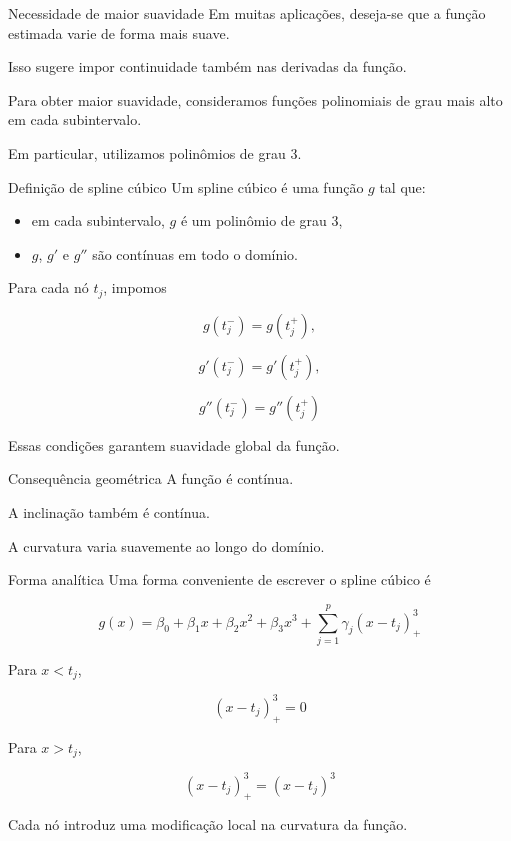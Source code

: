 \documentclass[
  ignorenonframetext,
  aspectratio=169,
]{beamer}
\providecommand{\tightlist}{%
  \setlength{\itemsep}{0pt}\setlength{\parskip}{0pt}}
\begin{document}
\begin{frame}
\begin{block}{Necessidade de maior suavidade}
\label{necessidade-de-maior-suavidade}
Em muitas aplicações, deseja-se que a função estimada varie de forma
mais suave.

Isso sugere impor continuidade também nas derivadas da função.

Para obter maior suavidade, consideramos funções polinomiais de grau
mais alto em cada subintervalo.

Em particular, utilizamos polinômios de grau 3.
\end{block}
\end{frame}

\begin{frame}
\begin{block}{Definição de spline cúbico}
\label{definiuxe7uxe3o-de-spline-cuxfabico}
Um spline cúbico é uma função \(g\) tal que:

\begin{itemize}
\tightlist
\item
  em cada subintervalo, \(g\) é um polinômio de grau 3,
\item
  \(g\), \(g'\) e \(g''\) são contínuas em todo o domínio.
\end{itemize}

Para cada nó \(t_j\), impomos

\[
g(t_j^-) = g(t_j^+),
\]

\[
g'(t_j^-) = g'(t_j^+),
\]

\[
g''(t_j^-) = g''(t_j^+)
\]

Essas condições garantem suavidade global da função.
\end{block}
\end{frame}

\begin{frame}
\begin{block}{Consequência geométrica}
\label{consequuxeancia-geomuxe9trica}
A função é contínua.

A inclinação também é contínua.

A curvatura varia suavemente ao longo do domínio.
\end{block}
\end{frame}

\begin{frame}
\begin{block}{Forma analítica}
\label{forma-analuxedtica-1}
Uma forma conveniente de escrever o spline cúbico é

\[
g(x) = \beta_0 + \beta_1 x + \beta_2 x^2 + \beta_3 x^3 + \sum_{j=1}^{p} \gamma_j (x - t_j)_+^3
\]

Para \(x < t_j\),

\[
(x - t_j)_+^3 = 0
\]

Para \(x > t_j\),

\[
(x - t_j)_+^3 = (x - t_j)^3
\]

Cada nó introduz uma modificação local na curvatura da função.
\end{block}
\end{frame}
\end{document}
